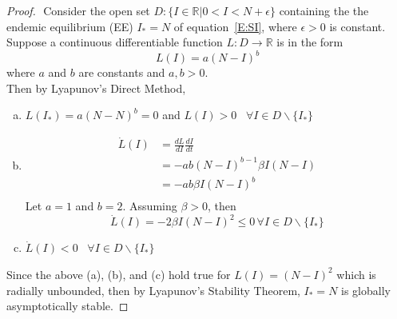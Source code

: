 \begin{proof} $ $\newline
    Consider the open set $D: \{I \in \mathbb{R}| 0 < I < N+ \epsilon \}$ containing the the endemic equilibrium (EE) $I_* = N$ of equation~\eqref{E:SI}, where $\epsilon > 0$ is constant.
    Suppose a continuous differentiable function $L:D\rightarrow \mathbb{R}$  is in the form
    \begin{equation}
        L(I) = a(N-I)^b
    \end{equation}
    where $a$ and $b$ are constants and $a, b > 0$.\\
    Then by Lyapunov's Direct Method,
    \begin{enumerate}[(a)]
        \item $L(I_*) = a(N-N)^b = 0$ and $L(I)>0$ \, $\forall I\in D\backslash \{I_*\}$
        \item
        \begin{align*}
            \dot{L}(I)  &= \frac{dL}{dI} \frac{dI}{dt} \\
            &= -ab(N-I)^{b-1}\beta I(N-I)\\
            &= -ab\beta I(N-I)^b\\
        \end{align*}
        Let $a = 1$ and $b = 2$. Assuming $\beta>0$, then
        $$\dot{L}(I) = -2\beta I(N-I)^2 \leq 0 \, \forall I \in D \backslash \{I_*\}$$
        \item $\dot{L}(I) < 0$ \, $\forall I\in D\backslash \{I_*\}$
    \end{enumerate}
    Since the above (a), (b), and (c) hold true for $L(I) = (N-I)^2$ which is radially unbounded, then by Lyapunov's Stability Theorem, $I_* = N$ is globally asymptotically stable.
\end{proof}
